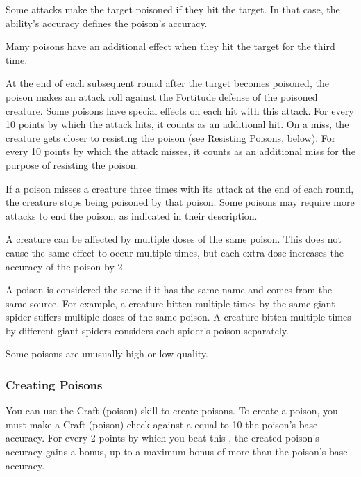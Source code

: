             Some attacks make the target poisoned if they hit the target.
            In that case, the ability's accuracy defines the poison's accuracy.

            Many poisons have an additional effect when they hit the target for the third time.

            At the end of each subsequent round after the target becomes poisoned, the poison makes an attack roll against the Fortitude defense of the poisoned creature.
            Some poisons have special effects on each hit with this attack.
            For every 10 points by which the attack hits, it counts as an additional hit.
            On a miss, the creature gets closer to resisting the poison (see Resisting Poisons, below).
            For every 10 points by which the attack misses, it counts as an additional miss for the purpose of resisting the poison.

            If a poison misses a creature three times with its attack at the end of each round, the creature stops being poisoned by that poison.
            Some poisons may require more attacks to end the poison, as indicated in their description.

            A creature can be affected by multiple doses of the same poison.
            This does not cause the same effect to occur multiple times, but each extra dose increases the accuracy of the poison by 2.

            A poison is considered the same if it has the same name and comes from the same source.
            For example, a creature bitten multiple times by the same giant spider suffers multiple doses of the same poison.
            A creature bitten multiple times by different giant spiders considers each spider's poison separately.

             Some poisons are unusually high or low quality.

        \subsubsection{Creating Poisons}\label{Creating Poisons}

            You can use the Craft (poison) skill to create poisons.
            To create a poison, you must make a Craft (poison) check against a  equal to 10 \add the poison's base accuracy.
            For every 2 points by which you beat this , the created poison's accuracy gains a  bonus, up to a maximum bonus of  more than the poison's base accuracy.

